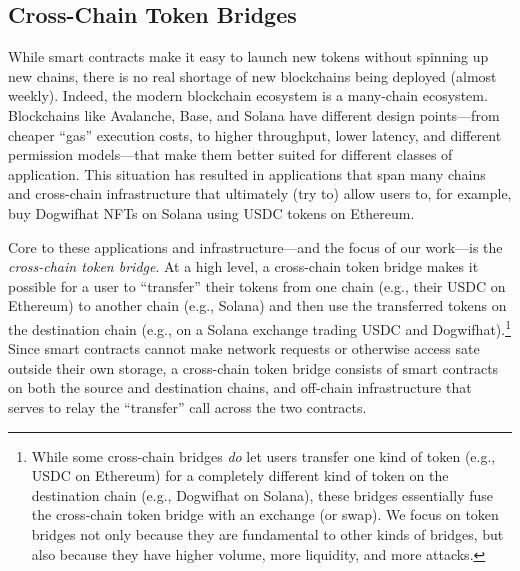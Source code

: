 


\subsection{Cross-Chain Token Bridges}
While smart contracts make it easy to launch new tokens without spinning up new
chains, there is no real shortage of new blockchains being deployed (almost weekly).  Indeed,
the modern blockchain ecosystem is a many-chain ecosystem.  Blockchains like
Avalanche, Base, and Solana have different design points---from cheaper ``gas''
execution costs, to higher throughput, lower latency, and different permission
models---that make them better suited for different classes of application.
This situation has resulted in applications that span many chains and cross-chain
infrastructure that ultimately (try to) allow users to, for example, buy
Dogwifhat NFTs on Solana using USDC tokens on Ethereum.

Core to these applications and infrastructure---and the focus of our work---is
the \emph{cross-chain token bridge}.  At a high level, a cross-chain token
bridge makes it possible for a user to ``transfer'' their tokens from one chain
(e.g., their USDC on Ethereum) to another chain (e.g., Solana) and then use the
transferred tokens on the destination chain (e.g., on a Solana exchange trading
USDC and Dogwifhat).\footnote{While some cross-chain bridges \emph{do} let users
transfer one kind of token (e.g., USDC on Ethereum) for a completely different
kind of token on the destination chain (e.g., Dogwifhat on Solana), these bridges
essentially fuse the cross-chain token bridge with an exchange (or swap). We
focus on token bridges not only because they are fundamental to other kinds of
bridges, but also because they have higher volume, more liquidity, and more
attacks.} Since smart contracts cannot make network requests or otherwise
access sate outside their own storage, a cross-chain token bridge consists of
smart contracts on both the source and destination chains, and off-chain
infrastructure that serves to relay the ``transfer'' call across the two
contracts.

